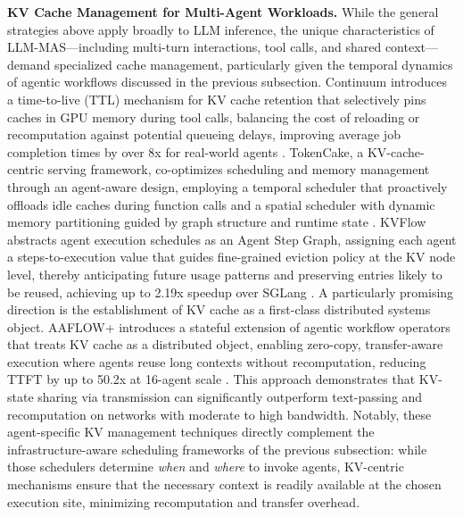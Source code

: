 \documentclass[11pt]{article}
\begin{document}
\textbf{KV Cache Management for Multi-Agent Workloads.} While the general strategies above apply broadly to LLM inference, the unique characteristics of LLM-MAS---including multi-turn interactions, tool calls, and shared context---demand specialized cache management, particularly given the temporal dynamics of agentic workflows discussed in the previous subsection. Continuum introduces a time-to-live (TTL) mechanism for KV cache retention that selectively pins caches in GPU memory during tool calls, balancing the cost of reloading or recomputation against potential queueing delays, improving average job completion times by over 8x for real-world agents \cite{ref318}. TokenCake, a KV-cache-centric serving framework, co-optimizes scheduling and memory management through an agent-aware design, employing a temporal scheduler that proactively offloads idle caches during function calls and a spatial scheduler with dynamic memory partitioning guided by graph structure and runtime state \cite{ref319}. KVFlow abstracts agent execution schedules as an Agent Step Graph, assigning each agent a steps-to-execution value that guides fine-grained eviction policy at the KV node level, thereby anticipating future usage patterns and preserving entries likely to be reused, achieving up to 2.19x speedup over SGLang \cite{ref320}. A particularly promising direction is the establishment of KV cache as a first-class distributed systems object. AAFLOW+ introduces a stateful extension of agentic workflow operators that treats KV cache as a distributed object, enabling zero-copy, transfer-aware execution where agents reuse long contexts without recomputation, reducing TTFT by up to 50.2x at 16-agent scale \cite{ref321}. This approach demonstrates that KV-state sharing via transmission can significantly outperform text-passing and recomputation on networks with moderate to high bandwidth. Notably, these agent-specific KV management techniques directly complement the infrastructure-aware scheduling frameworks of the previous subsection: while those schedulers determine \emph{when} and \emph{where} to invoke agents, KV-centric mechanisms ensure that the necessary context is readily available at the chosen execution site, minimizing recomputation and transfer overhead.
\end{document}

